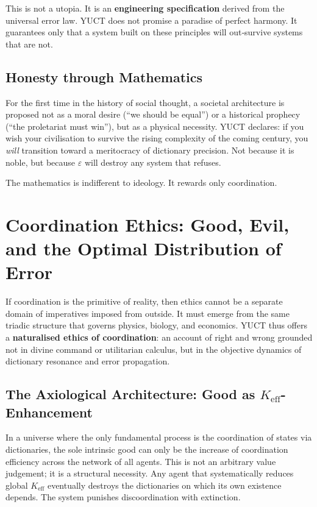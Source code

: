 \documentclass[12pt,a4paper]{article}
\begin{document}
	This is not a utopia. It is an \textbf{engineering specification} derived from the universal error law. YUCT does not promise a paradise of perfect harmony. It guarantees only that a system built on these principles will out‑survive systems that are not.
	
	\subsection{Honesty through Mathematics}
	
	For the first time in the history of social thought, a societal architecture is proposed not as a moral desire (``we should be equal'') or a historical prophecy (``the proletariat must win''), but as a physical necessity. YUCT declares: if you wish your civilisation to survive the rising complexity of the coming century, you \emph{will} transition toward a meritocracy of dictionary precision. Not because it is noble, but because \(\varepsilon\) will destroy any system that refuses.
	
	The mathematics is indifferent to ideology. It rewards only coordination.
	
	\section{Coordination Ethics: Good, Evil, and the Optimal Distribution of Error}
	\label{sec:coordination-ethics}
	
	If coordination is the primitive of reality, then ethics cannot be a separate domain of imperatives imposed from outside. It must emerge from the same triadic structure that governs physics, biology, and economics. YUCT thus offers a \textbf{naturalised ethics of coordination}: an account of right and wrong grounded not in divine command or utilitarian calculus, but in the objective dynamics of dictionary resonance and error propagation.
	
	\subsection{The Axiological Architecture: Good as $K_{\mathrm{eff}}$-Enhancement}
	
	In a universe where the only fundamental process is the coordination of states via dictionaries, the sole intrinsic good can only be the increase of coordination efficiency across the network of all agents. This is not an arbitrary value judgement; it is a structural necessity. Any agent that systematically reduces global $K_{\mathrm{eff}}$ eventually destroys the dictionaries on which its own existence depends. The system punishes discoordination with extinction.
	
\end{document}
